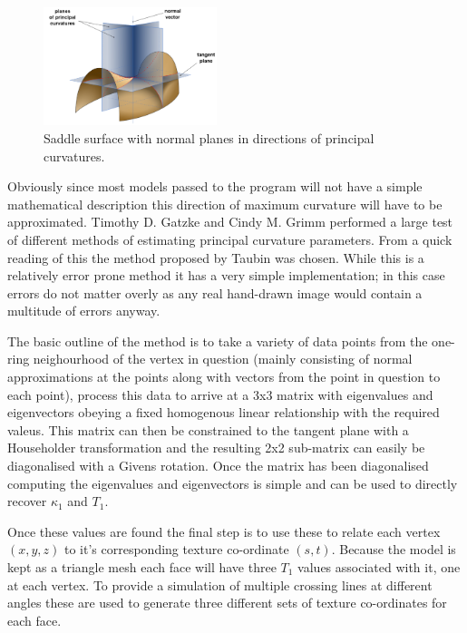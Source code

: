       \begin{figure}
        \centering
        \includegraphics[width=0.45\textwidth]{images/principal-curvature}
        \caption{Saddle surface with normal planes in directions of principal
        curvatures. \cite{principal-curvature-source}}
        \label{principal-curvature}
      \end{figure}

      Obviously since most models passed to the program will not have a simple
      mathematical description this direction of maximum curvature will have to
      be approximated.  Timothy D. Gatzke and Cindy M. Grimm performed a large
      test of different methods of estimating principal curvature
      parameters\cite{curvature-study}.  From a quick reading of this the method
      proposed by Taubin\cite{taubin} was chosen.  While this is a relatively
      error prone method it has a very simple implementation; in this case
      errors do not matter overly as any real hand-drawn image would contain a
      multitude of errors anyway.

      The basic outline of the method is to take a variety of data points from
      the one-ring neighourhood of the vertex in question (mainly consisting of
      normal approximations at the points along with vectors from the point in
      question to each point), process this data to arrive at a 3x3 matrix with
      eigenvalues and eigenvectors obeying a fixed homogenous linear
      relationship with the required valeus.  This matrix can then be
      constrained to the tangent plane with a Householder transformation and the
      resulting 2x2 sub-matrix can easily be diagonalised with a Givens
      rotation.  Once the matrix has been diagonalised computing the eigenvalues
      and eigenvectors is simple and can be used to directly recover $\kappa_1$
      and $T_1$.

      Once these values are found the final step is to use these to relate each
      vertex $\left(x, y, z\right)$ to it's corresponding texture co-ordinate
      $\left(s, t\right)$.  Because the model is kept as a triangle mesh each
      face will have three $T_1$ values associated with it, one at each vertex.
      To provide a simulation of multiple crossing lines at different angles
      these are used to generate three different sets of texture co-ordinates
      for each face.

